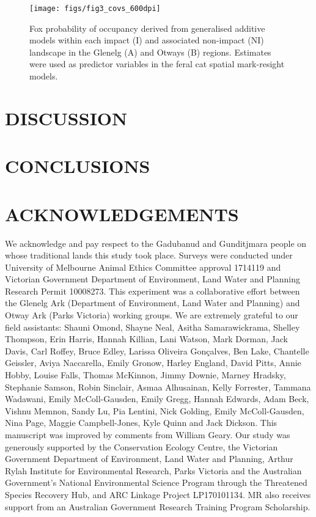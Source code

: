 \documentclass[]{elsarticle} %
\begin{document}
\begin{figure}
\texttt{[image: figs/fig3\_covs\_600dpi]} \caption{Fox probability of occupancy derived from generalised additive models within each impact (I) and associated non-impact (NI) landscape in the Glenelg (A) and Otways (B) regions. Estimates were used as predictor variables in the feral cat spatial mark-resight models.}\label{fig:foxplot}
\end{figure}

\newpage

\hypertarget{discussion}{%
\section{DISCUSSION}\label{discussion}}

\newpage

\hypertarget{conclusions}{%
\section{CONCLUSIONS}\label{conclusions}}

\newpage

\hypertarget{acknowledgements}{%
\section{ACKNOWLEDGEMENTS}\label{acknowledgements}}

We acknowledge and pay respect to the Gadubanud and Gunditjmara people on whose traditional lands this study took place. Surveys were conducted under University of Melbourne Animal Ethics Committee approval 1714119 and Victorian Government Department of Environment, Land Water and Planning Research Permit 10008273. This experiment was a collaborative effort between the Glenelg Ark (Department of Environment, Land Water and Planning) and Otway Ark (Parks Victoria) working groups.
We are extremely grateful to our field assistants: Shauni Omond, Shayne Neal, Asitha Samarawickrama, Shelley Thompson, Erin Harris, Hannah Killian, Lani Watson, Mark Dorman, Jack Davis, Carl Roffey, Bruce Edley, Larissa Oliveira Gonçalves, Ben Lake, Chantelle Geissler, Aviya Naccarella, Emily Gronow, Harley England, David Pitts, Annie Hobby, Louise Falls, Thomas McKinnon, Jimmy Downie, Marney Hradsky, Stephanie Samson, Robin Sinclair, Asmaa Alhusainan, Kelly Forrester, Tammana Wadawani, Emily McColl-Gausden, Emily Gregg, Hannah Edwards, Adam Beck, Vishnu Memnon, Sandy Lu, Pia Lentini, Nick Golding, Emily McColl-Gausden, Nina Page, Maggie Campbell-Jones, Kyle Quinn and Jack Dickson. This manuscript was improved by comments from William Geary. Our study was generously supported by the Conservation Ecology Centre, the Victorian Government Department of Environment, Land Water and Planning, Arthur Rylah Institute for Environmental Research, Parks Victoria and the Australian Government's National Environmental Science Program through the Threatened Species Recovery Hub, and ARC Linkage Project LP170101134. MR also receives support from an Australian Government Research Training Program Scholarship.
\end{document}
